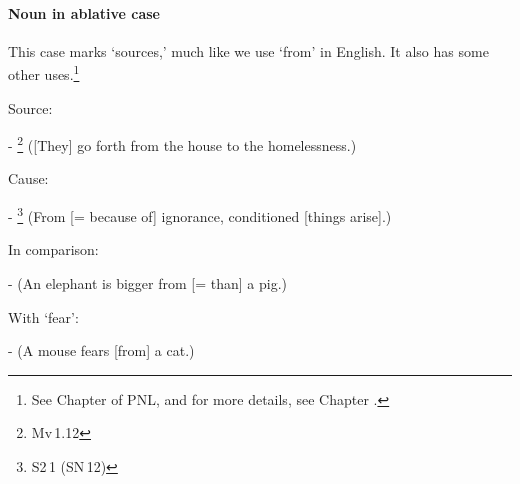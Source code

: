 \paragraph*{Noun in ablative case} This case marks `sources,' much like we use `from' in English. It also has some other uses.\footnote{See Chapter  of PNL, and for more details, see Chapter .}
\begin{compactenum}[(1)]
\item Source:\par
- \footnote{Mv\,1.12} ([They] go forth from the house to the homelessness.)\par
\item Cause:\par
- \footnote{S2\,1 (SN\,12)} (From [= because of] ignorance, conditioned [things arise].)\par
\item In comparison:\par
-  (An elephant is bigger from [= than] a pig.)\par
\item With `fear':\par
-  (A mouse fears [from] a cat.)\par
\end{compactenum}

